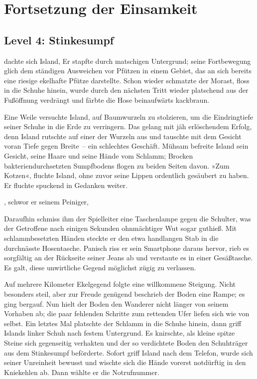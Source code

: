 \chapter{Fortsetzung der Einsamkeit}

\section{Level 4: Stinkesumpf}

 dachte sich Island,  Er stapfte durch matschigen Untergrund; seine Fortbewegung glich dem ständigen Ausweichen vor Pfützen in einem Gebiet, das an sich bereits eine riesige ekelhafte Pfütze darstellte. Schon wieder schmatzte der Morast, floss in die Schuhe hinein, wurde durch den nächsten Tritt wieder platschend aus der Fußöffnung verdrängt und färbte die Hose beinaufwärts kackbraun.

Eine Weile versuchte Island, auf Baumwurzeln zu stolzieren, um die Eindringtiefe seiner Schuhe in die Erde zu verringern. Das gelang mit jäh erlöschendem Erfolg, denn Island rutschte auf einer der Wurzeln aus und tauschte mit dem Gesicht voran Tiefe gegen Breite~– ein schlechtes Geschäft. Mühsam befreite Island sein Gesicht, seine Haare und seine Hände vom Schlamm; Brocken bakteriendurchsetzten Sumpfbodens flogen zu beiden Seiten davon. »Zum Kotzen«, fluchte Island, ohne zuvor seine Lippen ordentlich gesäubert zu haben. Er fluchte spuckend in Gedanken weiter.

, schwor er seinem Peiniger, 

Daraufhin schmiss ihm der Spielleiter eine Taschenlampe gegen die Schulter, was der Getroffene nach einigen Sekunden ohnmächtiger Wut sogar guthieß. Mit schlammbesetzten Händen steckte er den etwa handlangen Stab in die durchnässte Hosentasche. Panisch riss er sein Smartphone daraus hervor, rieb es sorgfältig an der Rückseite seiner Jeans ab und verstaute es in einer Gesäßtasche. Es galt, diese unwirtliche Gegend möglichst zügig zu verlassen.

Auf mehrere Kilometer Ekelgegend folgte eine willkommene Steigung. Nicht besonders steil, aber zur Freude genügend beschrieb der Boden eine Rampe; es ging bergauf. Nun hielt der Boden den Wanderer nicht länger von seinem Vorhaben ab; die paar fehlenden Schritte zum rettenden Ufer liefen sich wie von selbst. Ein letztes Mal platschte der Schlamm in die Schuhe hinein, dann griff Islands linker Schuh nach festem Untergrund. Es knirschte, als kleine spitze Steine sich gegenseitig verhakten und der so verdichtete Boden den Schuhträger aus dem Stinkesumpf beförderte. Sofort griff Island nach dem Telefon, wurde sich seiner Unreinheit bewusst und wischte sich die Hände vorerst notdürftig in den Kniekehlen ab. Dann wählte er die Notrufnummer.

